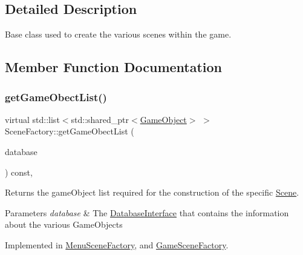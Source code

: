 \subsection{Detailed Description}
Base class used to create the various scenes within the game. 

\subsection{Member Function Documentation}
\mbox{\label{class_scene_factory_a2c8541230e95df49d2ab39b7c6ecdb78}} 
\subsubsection{\texorpdfstring{get\+Game\+Obect\+List()}{getGameObectList()}}
{\footnotesize\ttfamily virtual std\+::list$<$std\+::shared\+\_\+ptr$<$\hyperlink{class_game_object}{Game\+Object}$>$ $>$ Scene\+Factory\+::get\+Game\+Obect\+List (\begin{DoxyParamCaption}\item[{std\+::shared\+\_\+ptr$<$ \hyperlink{class_database_interface}{Database\+Interface} $>$}]{database }\end{DoxyParamCaption}) const\hspace{0.3cm}{\ttfamily [protected]}, {}}



Returns the game\+Object list required for the construction of the specific \hyperlink{class_scene}{Scene}. 


\begin{DoxyParams}{Parameters}
{\em database} & The \hyperlink{class_database_interface}{Database\+Interface} that contains the information about the various Game\+Objects \\
\hline
\end{DoxyParams}


Implemented in \hyperlink{class_menu_scene_factory_ade1881c377fa61d1d8fa11c1d30f4ddd}{Menu\+Scene\+Factory}, and \hyperlink{class_game_scene_factory_a2db801c1a1703a14a00c7b6e8bdca5b0}{Game\+Scene\+Factory}.

\mbox{\label{class_scene_factory_a9721384ff0d8703f0ef28bf9061fe402}} 
